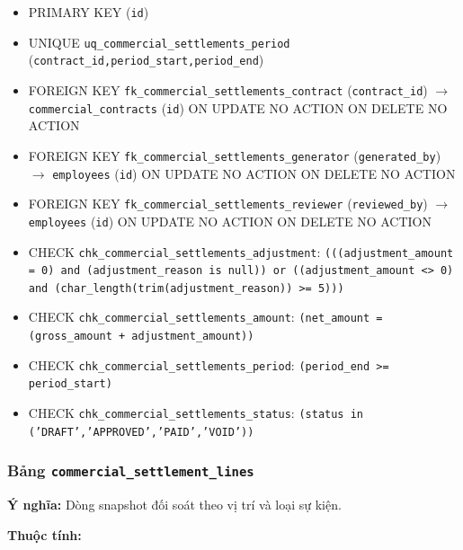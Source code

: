 \begin{itemize}

\item PRIMARY KEY (\texttt{id})

\item UNIQUE \texttt{uq\_commercial\_settlements\_period} (\texttt{contract\_id,period\_start,period\_end})

\item FOREIGN KEY \texttt{fk\_commercial\_settlements\_contract} (\texttt{contract\_id}) $\rightarrow$ \texttt{commercial\_contracts} (\texttt{id}) ON UPDATE NO ACTION ON DELETE NO ACTION

\item FOREIGN KEY \texttt{fk\_commercial\_settlements\_generator} (\texttt{generated\_by}) $\rightarrow$ \texttt{employees} (\texttt{id}) ON UPDATE NO ACTION ON DELETE NO ACTION

\item FOREIGN KEY \texttt{fk\_commercial\_settlements\_reviewer} (\texttt{reviewed\_by}) $\rightarrow$ \texttt{employees} (\texttt{id}) ON UPDATE NO ACTION ON DELETE NO ACTION

\item CHECK \texttt{chk\_commercial\_settlements\_adjustment}: \texttt{(((adjustment\_amount = 0) and (adjustment\_reason is null)) or ((adjustment\_amount <> 0) and (char\_length(trim(adjustment\_reason)) >= 5)))}

\item CHECK \texttt{chk\_commercial\_settlements\_amount}: \texttt{(net\_amount = (gross\_amount + adjustment\_amount))}

\item CHECK \texttt{chk\_commercial\_settlements\_period}: \texttt{(period\_end >= period\_start)}

\item CHECK \texttt{chk\_commercial\_settlements\_status}: \texttt{(status in ('DRAFT','APPROVED','PAID','VOID'))}

\end{itemize}

\subsubsection{Bảng \texttt{commercial\_settlement\_lines}}

\textbf{Ý nghĩa:} Dòng snapshot đối soát theo vị trí và loại sự kiện.\par

\textbf{Thuộc tính:}

